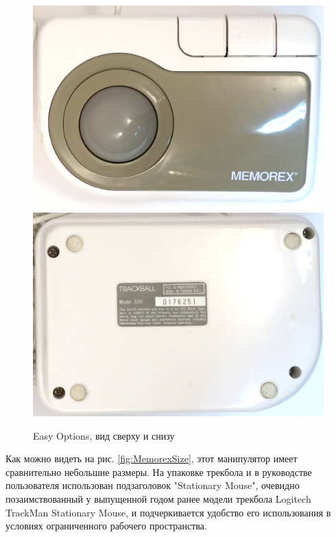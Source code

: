 \documentclass[11pt, a4paper]{article}
\begin{document}
\begin{figure}[h]
    \centering
    \includegraphics[scale=0.45]{1994_memorex_trackball/top_30.jpg}
    \includegraphics[scale=0.45]{1994_memorex_trackball/bottom_30.jpg}
    \caption{Easy Options, вид сверху и снизу}
    \label{fig:MemorexTopBottom}
\end{figure}

Как можно видеть на рис. \ref{fig:MemorexSize}, этот манипулятор имеет сравнительно небольшие размеры.
На упаковке трекбола и в руководстве пользователя использован подзаголовок "Stationary Mouse", очевидно позаимствованный у выпущенной годом ранее модели трекбола Logitech TrackMan Stationary Mouse, и подчеркивается удобство его использования в условиях ограниченного рабочего пространства.
\end{document}
